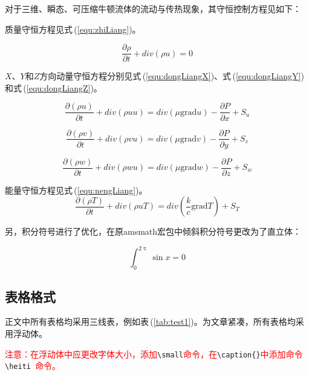 对于三维、瞬态、可压缩牛顿流体的流动与传热现象，其守恒控制方程见如下：

质量守恒方程见式\,(\ref{equ:zhiLiang})。

\begin{equation}\label{equ:zhiLiang}
\frac{\partial\rho}{\partial t}+div\left(\rho u\right)=0
\end{equation}

$X$、$Y$和$Z$方向动量守恒方程分别见式\,(\ref{equ:dongLiangX})、式\,(\ref{equ:dongLiangY})和式\,(\ref{equ:dongLiangZ})。

\begin{equation}\label{equ:dongLiangX}
\frac{\partial\left(\rho u\right)}{\partial t} + div\left(\rho uu\right)=div\left(\mu\mathrm{grad}u\right)-\frac{\partial P}{\partial x}+S_u
\end{equation}

\begin{equation}\label{equ:dongLiangY}
\frac{\partial\left(\rho v\right)}{\partial t} + div\left(\rho vu\right)=div\left(\mu\mathrm{grad}v\right)-\frac{\partial P}{\partial y}+S_v
\end{equation}

\begin{equation}\label{equ:dongLiangZ}
\frac{\partial\left(\rho w\right)}{\partial t} + div\left(\rho wu\right)=div\left(\mu\mathrm{grad}w\right)-\frac{\partial P}{\partial z}+S_w
\end{equation}

能量守恒方程见式\,(\ref{equ:nengLiang})。
\begin{equation}\label{equ:nengLiang}
\frac{\partial\left(\rho T\right)}{\partial t}+div\left(\rho uT\right)=div\left(\frac{k}{c}\mathrm{grad}T\right)+S_T
\end{equation}

另，积分符号进行了优化，在原amsmath宏包中倾斜积分符号更改为了直立体：

\begin{equation}\label{equ:int}
  \int_0^{2\uppi}\sin x = 0
\end{equation}

\subsection{表格格式}

正文中所有表格均采用三线表，例如表\,(\ref{tab:test1})。为文章紧凑，所有表格均采用浮动体。

\textcolor{red}{注意：在浮动体中应更改字体大小，添加}\verb"\small"\textcolor{red}{命令，在}\verb"\caption{}"\textcolor{red}{中添加命令}\verb"\heiti "\textcolor{red}{命令。}

